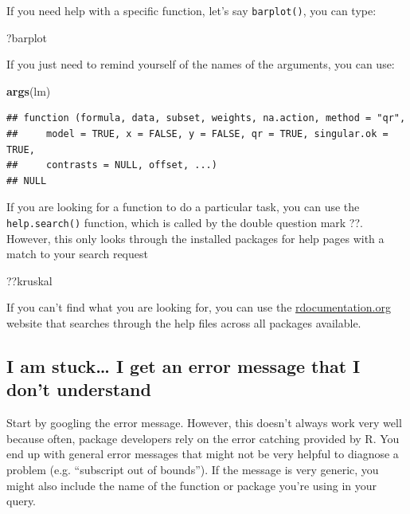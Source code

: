 \documentclass[]{book}
\newenvironment{Shaded}{\begin{snugshade}}{\end{snugshade}}
\newcommand{\KeywordTok}[1]{\textcolor[rgb]{0.13,0.29,0.53}{\textbf{#1}}}
\newcommand{\NormalTok}[1]{#1}
\begin{document}
If you need help with a specific function, let's say \texttt{barplot()}, you can type:

\begin{Shaded}
\begin{Highlighting}[]
\NormalTok{?barplot}
\end{Highlighting}
\end{Shaded}

If you just need to remind yourself of the names of the arguments, you can use:

\begin{Shaded}
\begin{Highlighting}[]
\KeywordTok{args}\NormalTok{(lm)}
\end{Highlighting}
\end{Shaded}

\begin{verbatim}
## function (formula, data, subset, weights, na.action, method = "qr", 
##     model = TRUE, x = FALSE, y = FALSE, qr = TRUE, singular.ok = TRUE, 
##     contrasts = NULL, offset, ...) 
## NULL
\end{verbatim}

If you are looking for a function to do a particular task, you can use the \texttt{help.search()} function, which is called by the double question mark ??. However, this only looks through the installed packages for help pages with a match to your search request

\begin{Shaded}
\begin{Highlighting}[]
\NormalTok{??kruskal}
\end{Highlighting}
\end{Shaded}

If you can't find what you are looking for, you can use the \href{https://www.rdocumentation.org}{rdocumentation.org} website that searches through the help files across all packages available.

\hypertarget{i-am-stuck-i-get-an-error-message-that-i-dont-understand}{%
\subsection*{I am stuck\ldots{} I get an error message that I don't understand}\label{i-am-stuck-i-get-an-error-message-that-i-dont-understand}}

Start by googling the error message. However, this doesn't always work very well because often, package developers rely on the error catching provided by R. You end up with general error messages that might not be very helpful to diagnose a problem (e.g. ``subscript out of bounds''). If the message is very generic, you might also include the name of the function or package you're using in your query.
\end{document}
